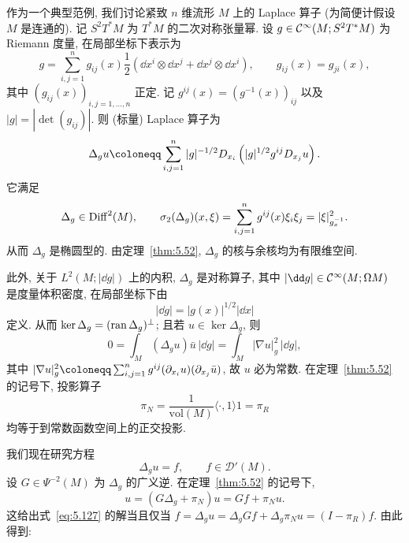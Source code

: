 作为一个典型范例, 我们讨论紧致 $n$ 维流形 $M$ 上的 Laplace 算子 (为简便计假设 $M$ 是连通的). 记 $S^2 T^* M$ 为 $T^* M$ 的二次对称张量幂. 设 $g \in \mathcal{C}^\infty(M; S^2 T^* M)$ 为 Riemann 度量, 在局部坐标下表示为
\begin{equation}\label{eq:5.121}
    g = \sum_{i,j=1}^n g_{ij}(x) \frac{1}{2}(\dd x^i \otimes \dd x^j + \dd x^j \otimes \dd x^i), \qquad g_{ij}(x) = g_{ji}(x),
\end{equation}
其中 $(g_{ij}(x))_{i,j=1,\ldots,n}$ 正定. 记 $g^{ij}(x) = (g^{-1}(x))_{ij}$ 以及 $|g| = |\!\det(g_{ij})|$. 则 (标量) Laplace 算子为
\begin{equation}\label{eq:5.122}
    \Delta_g u \defeq \sum_{i,j=1}^n |g|^{-1/2} D_{x_i} \left( |g|^{1/2} g^{ij} D_{x_j} u \right).
\end{equation}
它满足
\begin{equation}\label{eq:5.123}
    \Delta_g \in \operatorname{Diff}^2(M), \qquad \sigma_2(\Delta_g)(x, \xi) = \sum_{i,j=1}^n g^{ij}(x) \xi_i \xi_j = |\xi|_{g_x^{-1}}^2.
\end{equation}
从而 $\Delta_g$ 是椭圆型的. 由定理~\ref{thm:5.52}, $\Delta_g$ 的核与余核均为有限维空间.

此外, 关于 $L^2(M; |\dd g|)$ 上的内积, $\Delta_g$ 是对称算子, 其中 $|\dd g| \in \Smooth(M; \Omega M)$ 是度量体积密度, 在局部坐标下由
\begin{equation}\label{eq:5.124}
    |\dd g| = |g(x)|^{1/2} |\dd x|
\end{equation}
定义. 从而 $\ker\Delta_g = (\operatorname{ran}\Delta_g)^\perp$; 且若 $u \in \ker\Delta_g$, 则
\begin{equation}\label{eq:5.125}
    0 = \int_M (\Delta_g u) \bar{u} \,|\dd g| = \int_M |\nabla u|_g^2 \,|\dd g|,
\end{equation}
其中 $|\nabla u|_g^2 \defeq \sum_{i,j=1}^n g^{ij}(\partial_{x_i} u)(\partial_{x_j} \bar{u})$, 故 $u$ 必为常数. 在定理~\ref{thm:5.52} 的记号下, 投影算子
\begin{equation}\label{eq:5.126}
    \pi_N = \frac{1}{\mathrm{vol}(M)} \langle \cdot, 1 \rangle 1 = \pi_R
\end{equation}
均等于到常数函数空间上的正交投影.

我们现在研究方程
\begin{equation}\label{eq:5.127}
    \Delta_g u = f, \qquad f \in \mathcal{D}'(M).
\end{equation}
设 $G \in \Psi^{-2}(M)$ 为 $\Delta_g$ 的广义逆. 在定理~\ref{thm:5.52} 的记号下,
\begin{equation}\label{eq:5.128}
    u = (G \Delta_g + \pi_N) u = G f + \pi_N u.
\end{equation}
这给出式~\eqref{eq:5.127} 的解当且仅当 $f = \Delta_g u = \Delta_g G f + \Delta_g \pi_N u = (I - \pi_R) f$. 由此得到:

